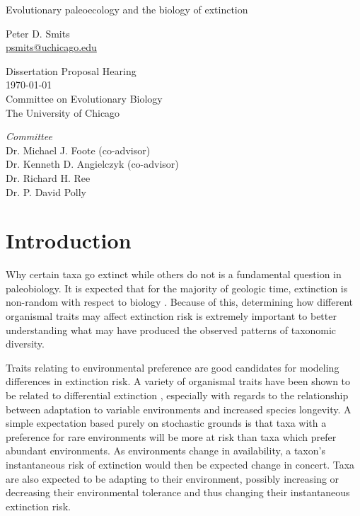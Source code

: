 \documentclass[12pt,letterpaper]{article}
\begin{document}
\begin{titlepage}
  \begin{center}
    \huge{Evolutionary paleoecology and the biology of extinction}

    \vspace{1.5cm}

    \large{Peter D. Smits \\}
    \footnotesize{\href{mailto:psmits@uchicago.edu}{psmits@uchicago.edu}}

    \vspace{1.5cm}

    Dissertation Proposal Hearing \\
    \today \\
    Committee on Evolutionary Biology \\
    The University of Chicago

    \vspace{1.5cm}

    \textit{Committee} \\
    Dr. Michael J. Foote (co-advisor) \\
    Dr. Kenneth D. Angielczyk (co-advisor) \\
    Dr. Richard H. Ree \\
    Dr. P. David Polly
  \end{center}
\end{titlepage}


\section{Introduction}
Why certain taxa go extinct while others do not is a fundamental question in paleobiology. It is expected that for the majority of geologic time, extinction is non-random with respect to biology \citep{Jablonski1986,Alexander1977,Harnik2011,Johnson2002b,Kitchell1986,Nurnberg2013a,Payne2007}. Because of this, determining how different organismal traits may affect extinction risk is extremely important to better understanding what may have produced the observed patterns of taxonomic diversity. 

Traits relating to environmental preference are good candidates for modeling differences in extinction risk. A variety of organismal traits have been shown to be related to differential extinction \citep{Foote2013,Liow2007b,Baumiller1993,Nurnberg2013a,Alexander1977,Kitchell1986}, especially with regards to the relationship between adaptation to variable environments and increased species longevity. A simple expectation based purely on stochastic grounds is that taxa with a preference for rare environments will be more at risk than taxa which prefer abundant environments. As environments change in availability, a taxon's instantaneous risk of extinction would then be expected change in concert. Taxa are also expected to be adapting to their environment, possibly increasing or decreasing their environmental tolerance and thus changing their instantaneous extinction risk. 
\end{document}
